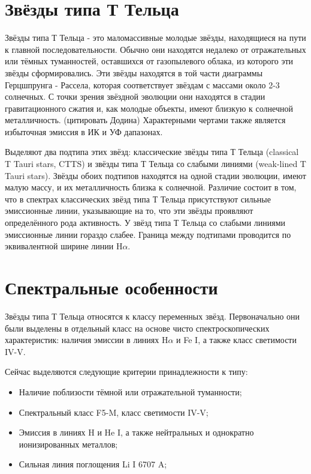 
\section{Звёзды типа Т Тельца}
Звёзды типа Т Тельца - это маломассивные молодые звёзды, находящиеся на пути к главной последовательности. Обычно они находятся недалеко от отражательных или тёмных туманностей, оставшихся от газопылевого облака, из которого эти звёзды сформировались. Эти звёзды находятся в той части диаграммы Герцшпрунга - Рассела, которая соответствует звёздам с массами около 2-3 солнечных. С точки зрения звёздной эволюции они находятся в стадии гравитационного сжатия и, как молодые объекты, имеют близкую к солнечной металличность. (цитировать Додина) Характерными чертами также является избыточная эмиссия в ИК и УФ дапазонах.

Выделяют два подтипа этих звёзд: классические звёзды типа Т Тельца (classical T Tauri stars, CTTS) и звёзды типа Т Тельца со слабыми линиями (weak-lined T Tauri stars). Звёзды обоих подтипов находятся на одной стадии эволюции, имеют малую массу, и их металличность близка к солнечной. Различие состоит в том, что в спектрах классических звёзд типа Т Тельца присутствуют сильные эмиссионные линии, указывающие на то, что эти звёзды проявляют определённого рода активность. У звёзд типа Т Тельца со слабыми линиями эмиссионные линии гораздо слабее. Граница между подтипами проводится по эквивалентной ширине линии H$\alpha$. 


\section{Спектральные особенности}
Звёзды типа Т Тельца относятся к классу переменных звёзд. Первоначально они были выделены в отдельный класс на основе чисто спектроскопических характеристик: наличия эмиссии в линиях H$\alpha$ и Fe I, а также класс светимости IV-V. 

Сейчас выделяются следующие критерии принадлежности к типу:
\begin{itemize}
	\item Наличие поблизости тёмной или отражательной туманности;
	\item	Спектральный класс F5-M, класс светимости IV-V;
	\item	Эмиссия в линиях H и He I, а также нейтральных и однократно ионизированных металлов;
	\item	Сильная линия поглощения Li I 6707 A;
\end{itemize}

